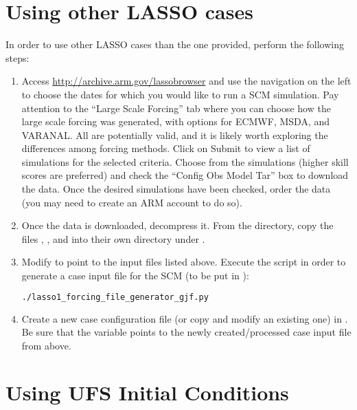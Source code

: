 \section{Using other LASSO cases}
\label{sec:lasso}

In order to use other LASSO cases than the one provided, perform the following steps:
\begin{enumerate}
\item Access \url{http://archive.arm.gov/lassobrowser} and use the navigation on the left to choose the dates for which you would like to run a SCM simulation. Pay attention to the ``Large Scale Forcing'' tab where you can choose how the large scale forcing was generated, with options for ECMWF, MSDA, and VARANAL. All are potentially valid, and it is likely worth exploring the differences among forcing methods. Click on Submit to view a list of simulations for the selected criteria. Choose from the simulations (higher skill scores are preferred) and check the ``Config Obs Model Tar'' box to download the data. Once the desired simulations have been checked, order the data (you may need to create an ARM account to do so).
\item Once the data is downloaded, decompress it. From the  directory, copy the files , , and  into their own directory under .
\item Modify  to point to the input files listed above. Execute the script in order to generate a case input file for the SCM (to be put in ):
\begin{lstlisting}[language=bash]
./lasso1_forcing_file_generator_gjf.py
\end{lstlisting}
\item Create a new case configuration file (or copy and modify an existing one) in . Be sure that the  variable points to the newly created/processed case input file from above.
\end{enumerate}

\section{Using UFS Initial Conditions}
\label{sec:UFS ICs}

